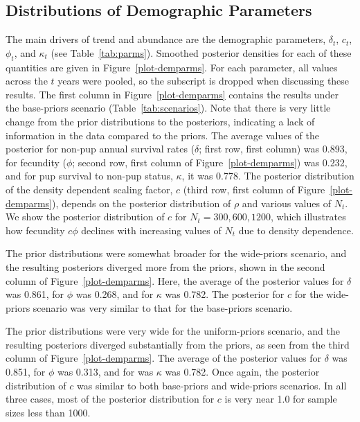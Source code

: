 \documentclass[12pt, titlepage]{article}\usepackage[]{graphicx}\usepackage[]{color}
\begin{document}

\subsection{Distributions of Demographic Parameters}

The main drivers of trend and abundance are the demographic parameters, $\delta_t$, $c_t$, $\phi_t$, and $\kappa_t$ (see Table~\ref{tab:parms}). Smoothed posterior densities for each of these quantities are given in Figure~\ref{plot-demparms}. For each parameter, all values across the $t$ years were pooled, so the subscript is dropped when discussing these results. The first column in Figure~\ref{plot-demparms} contains the results under the base-priors scenario (Table~\ref{tab:scenarios}). Note that there is very little change from the prior distributions to the posteriors, indicating a lack of information in the data compared to the priors.  The average values of the posterior for non-pup annual survival rates ($\delta$; first row, first column) was 0.893, for fecundity ($\phi$; second row, first column of Figure~\ref{plot-demparms}) was 0.232, and for pup survival to non-pup status, $\kappa$, it was 0.778. The posterior distribution of the density dependent scaling factor, $c$ (third row, first column of Figure~\ref{plot-demparms}), depends on the posterior distribution of $\rho$ and various values of $N_t$. We show the posterior distribution of $c$ for $N_t = 300, 600, 1200$, which illustrates how fecundity $c\phi$ declines with increasing values of $N_t$ due to density dependence.

The prior distributions were somewhat broader for the wide-priors scenario, and the resulting posteriors diverged more from the priors, shown in the second column of Figure~\ref{plot-demparms}. Here, the average of the posterior values for $\delta$ was 0.861, for $\phi$ was 0.268, and for $\kappa$ was 0.782. The posterior for $c$ for the wide-priors scenario was very similar to that for the base-priors scenario.

The prior distributions were very wide for the uniform-priors scenario, and the resulting posteriors diverged substantially from the priors, as seen from the third column of Figure~\ref{plot-demparms}. The average of the posterior values for $\delta$ was 0.851, for $\phi$ was 0.313, and for was $\kappa$ was 0.782. Once again, the posterior distribution of $c$ was similar to both base-priors and wide-priors scenarios.  In all three cases, most of the posterior distribution for $c$ is very near 1.0 for sample sizes less than 1000.
\end{document}

